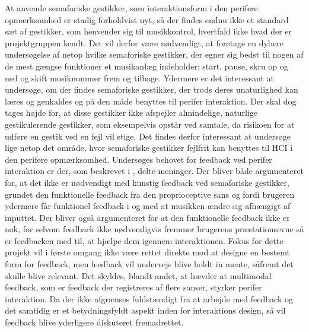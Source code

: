 At anvende semaforiske gestikker, som interaktionsform i den perifere opmærksomhed er stadig forholdvist nyt, så der findes endnu ikke et standard sæt af gestikker, som henvender sig til musikkontrol, hvertfald ikke hvad der er projektgruppen kendt. Det vil derfor være nødvendigt, at foretage en dybere undersøgelse af netop hvilke semaforiske gestikker, der egner sig bedst til nogen af de mest gængse funktioner et musikanlæg indeholder; start, pause, skru op og ned og skift musiknummer frem og tilbage. Ydermere er det interessant at undersøge, om der findes semaforiske gestikker, der trods deres unaturlighed kan læres og genkaldes og på den måde benyttes til perifer interaktion. Der skal dog tages højde for, at disse gestikker ikke afspejler almindelige, naturlige gestikulerende gestikker, som eksempelvis opstår ved samtale, da risikoen for at udføre en gestik ved en fejl vil stige. Det findes derfor interessant at undersøge lige netop det område, hvor semaforiske gestikker fejlfrit kan benyttes til HCI i den perifere opmærksomhed. \blankline
%
Undersøges behovet for feedback ved perifer interaktion er der, som beskrevet i , delte meninger. Der bliver både argumenteret for, at det ikke er nødvendigt med kunstig feedback ved semaforiske gestikker, grundet den funktionelle feedback fra den proprioceptive sans og fordi brugeren ydermere får funktionel feedback i og med at musikken ændre sig afhængigt af inputtet. Der bliver også argumenteret for at den funktionelle feedback ikke er nok, for selvom feedback ikke nødvendigvis fremmer brugerens præstationsevne så er feedbacken med til, at hjælpe dem igennem interaktionen. Fokus for dette projekt vil i første omgang ikke være rettet direkte mod at designe en bestemt form for feedback, men feedback vil undervejs blive holdt in mente, såfremt det skulle blive relevant. Det skyldes, blandt andet, at \textcite[s. 21]{PDF:FacilitatingPIDesignAndEvaluation} hævder at multimodal feedback, som er feedback der registreres af flere sanser, styrker perifer interaktion. Da der ikke afgrænses fuldstændigt fra at arbejde med feedback og det samtidig er et betydningsfyldt aspekt inden for interaktions design, så vil feedback blive yderligere diskuteret fremadrettet.  

